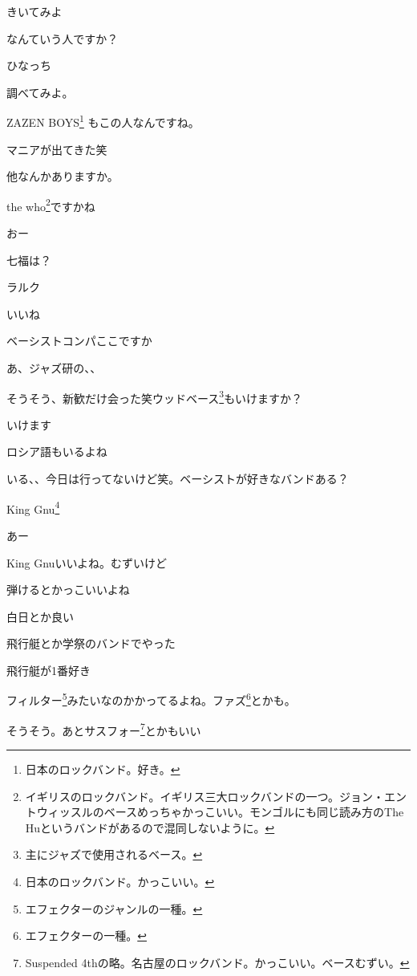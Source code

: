 \begin{multicols}{3}
きいてみよ

なんていう人ですか？

ひなっち

調べてみよ。

ZAZEN BOYS\footnote{日本のロックバンド。好き。} もこの人なんですね。

マニアが出てきた笑

他なんかありますか。

the who\footnote{イギリスのロックバンド。イギリス三大ロックバンドの一つ。ジョン・エントウィッスルのベースめっちゃかっこいい。モンゴルにも同じ読み方のThe Huというバンドがあるので混同しないように。}ですかね

おー

七福は？

ラルク

いいね

ベーシストコンパここですか

あ、ジャズ研の、、

そうそう、新歓だけ会った笑ウッドベース\footnote{主にジャズで使用されるベース。
}もいけますか？

いけます

ロシア語もいるよね

いる、、今日は行ってないけど笑。ベーシストが好きなバンドある？

King Gnu\footnote{日本のロックバンド。かっこいい。}

あー

King Gnuいいよね。むずいけど

弾けるとかっこいいよね

白日とか良い

飛行艇とか学祭のバンドでやった

飛行艇が1番好き

フィルター\footnote{エフェクターのジャンルの一種。}みたいなのかかってるよね。ファズ\footnote{エフェクターの一種。}とかも。

そうそう。あとサスフォー\footnote{Suspended 4thの略。名古屋のロックバンド。かっこいい。ベースむずい。}とかもいい


\end{multicols}
